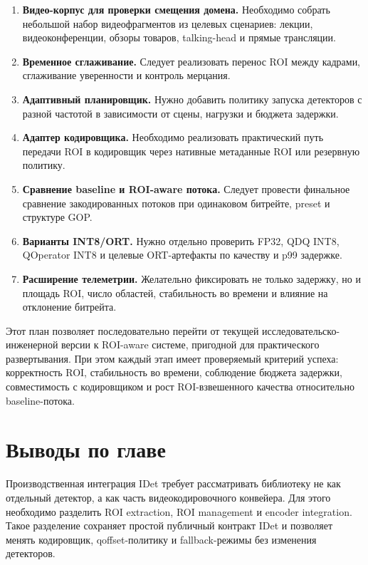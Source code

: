 \documentclass[12pt,a4paper,oneside,openany]{report}
\newcommand{\important}[1]{\textbf{#1}}
\begin{document}
\begin{enumerate}[label=\arabic*)]
\item \important{Видео-корпус для проверки смещения домена.} Необходимо собрать небольшой набор видеофрагментов из целевых сценариев: лекции, видеоконференции, обзоры товаров, talking-head и прямые трансляции.
\item \important{Временное сглаживание.} Следует реализовать перенос ROI между кадрами, сглаживание уверенности и контроль мерцания.
\item \important{Адаптивный планировщик.} Нужно добавить политику запуска детекторов с разной частотой в зависимости от сцены, нагрузки и бюджета задержки.
\item \important{Адаптер кодировщика.} Необходимо реализовать практический путь передачи ROI в кодировщик через нативные метаданные ROI или резервную политику.
\item \important{Сравнение baseline и ROI-aware потока.} Следует провести финальное сравнение закодированных потоков при одинаковом битрейте, preset и структуре GOP.
\item \important{Варианты INT8/ORT.} Нужно отдельно проверить FP32, QDQ INT8, QOperator INT8 и целевые ORT-артефакты по качеству и p99 задержке.
\item \important{Расширение телеметрии.} Желательно фиксировать не только задержку, но и площадь ROI, число областей, стабильность во времени и влияние на отклонение битрейта.
\end{enumerate}

Этот план позволяет последовательно перейти от текущей исследовательско-инженерной версии к ROI-aware системе, пригодной для практического развертывания. При этом каждый этап имеет проверяемый критерий успеха: корректность ROI, стабильность во времени, соблюдение бюджета задержки, совместимость с кодировщиком и рост ROI-взвешенного качества относительно baseline-потока.


\section{Выводы по главе}

Производственная интеграция IDet требует рассматривать библиотеку не как отдельный детектор, а как часть видеокодировочного конвейера. Для этого необходимо разделить ROI extraction, ROI management и encoder integration. Такое разделение сохраняет простой публичный контракт IDet и позволяет менять кодировщик, qoffset-политику и fallback-режимы без изменения детекторов.
\end{document}

